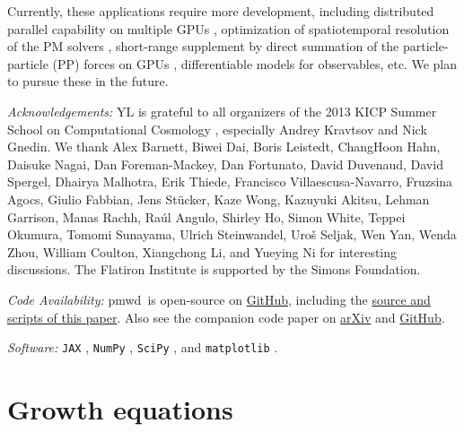 \documentclass[modern, trackchanges, dvipsnames]{aastex631}
\newcommand{\pmwd}{{\usefont{T1}{nova}{m}{sl}pmwd}}
\begin{document}
Currently, these applications require more development, including
distributed parallel capability on multiple GPUs \citep{FlowPM},
optimization of spatiotemporal resolution of the PM solvers \citep{LDL,
LanzieriLanusseEtAl2022, ZhangLiEtAl}, short-range supplement by direct
summation of the particle-particle (PP) forces on GPUs \citep{HACC,
PKDGRAV3, ABACUS}, differentiable models for observables, etc.
We plan to pursue these in the future.



\vspace{1em}
\textit{\large Acknowledgements:}
YL is grateful to all organizers of the 2013 KICP Summer School on
Computational Cosmology \citep{KICPsummer2013}, especially Andrey
Kravtsov and Nick Gnedin.
We thank Alex Barnett, Biwei Dai, Boris Leistedt, ChangHoon Hahn,
Daisuke Nagai, Dan Foreman-Mackey, Dan Fortunato, David Duvenaud, David
Spergel, Dhairya Malhotra, Erik Thiede, Francisco Villaescusa-Navarro,
Fruzsina Agocs, Giulio Fabbian, Jens St\"ucker, Kaze Wong, Kazuyuki
Akitsu, Lehman Garrison, Manas Rachh, Ra\'ul Angulo, Shirley Ho, Simon
White, Teppei Okumura, Tomomi Sunayama, Ulrich Steinwandel, Uro\v{s}
Seljak, Wen Yan, Wenda Zhou, William Coulton, Xiangchong Li, and Yueying
Ni for interesting discussions.
The Flatiron Institute is supported by the Simons Foundation.


\vspace{1em}
\textit{\large Code Availability:}
\pmwd\ is open-source on
\href{https://github.com/eelregit/pmwd}{GitHub}, including the
\href{https://github.com/eelregit/pmwd/tree/master/docs/papers/adjoint}{source
and scripts of this paper}.
Also see the companion code paper on
\href{https://arxiv.org/abs/2211.THIS+1}{arXiv} and
\href{https://github.com/eelregit/pmwd/tree/master/docs/papers/pmwd}{GitHub}.


\vspace{1em}
\textit{\large Software:}
\texttt{JAX} \citep{JAX}, \texttt{NumPy} \citep{NumPy}, \texttt{SciPy}
\citep{SciPy}, and \texttt{matplotlib} \citep{matplotlib}.



\vspace{1em}
\appendix


\vspace{1em}
\section{Growth equations}
\label{app:growth}
\end{document}
